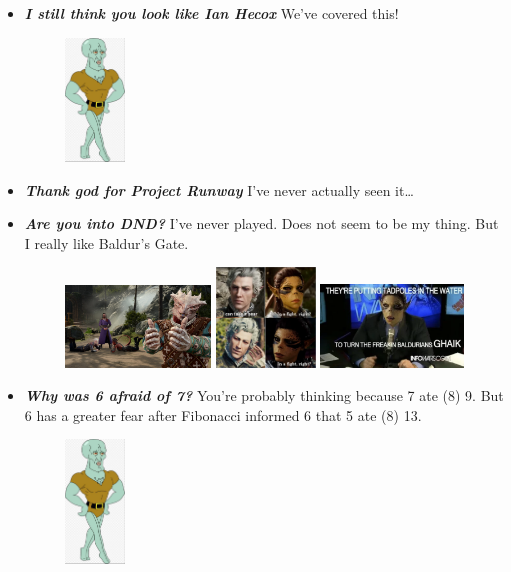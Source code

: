 \documentclass[11pt,letterpaper]{article}
\begin{document}
\begin{itemize}
\item {\bfseries\itshape I still think you look like Ian Hecox} We've covered this!
	\begin{figure}[H]
	\centering
	\includegraphics[width=0.15\textwidth]{images/handsomesquidward.jpg}
	\end{figure}

\item {\bfseries\itshape Thank god for Project Runway} I've never actually seen it\dots

\item {\bfseries\itshape Are you into DND?} I've never played. Does not seem to be my thing. But I really like Baldur's Gate.
	\begin{figure}[H]
	\centering
	\includegraphics[width=0.365\textwidth]{images/baldur.jpg}
	\includegraphics[width=0.25\textwidth]{images/baldur2.png}
	\includegraphics[width=0.36\textwidth]{images/baldur3.png}
	\end{figure}

\item {\bfseries\itshape Why was 6 afraid of 7?} You're probably thinking because 7 ate (8) 9. But 6 has a greater fear after Fibonacci informed 6 that 5 ate (8) 13. 
	\begin{figure}[H]
	\centering
	\includegraphics[width=0.15\textwidth]{images/handsomesquidward.jpg}
	\end{figure}


\end{itemize}
\end{document}

